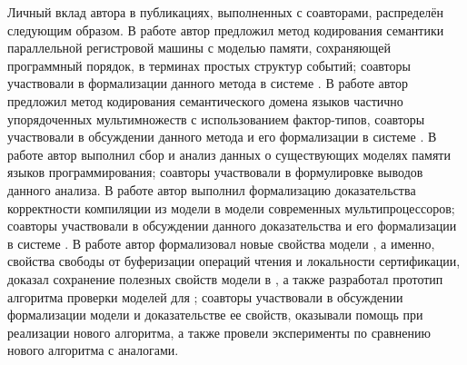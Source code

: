 
Личный вклад автора в публикациях, выполненных с соавторами, распределён следующим образом.
В работе \cite{Gladstein-al:ISPRAS21} автор предложил
метод кодирования семантики параллельной регистровой машины с
моделью памяти, сохраняющей программный порядок, в терминах простых структур событий;
соавторы участвовали в формализации данного метода в системе \coq.
В работе \cite{Moiseenko-al:STJITMO22} автор предложил
метод кодирования семантического домена языков частично упорядоченных мультимножеств
с использованием фактор-типов, 
соавторы участвовали в обсуждении данного метода и его формализации в системе \coq.
В работе \cite{Moiseenko-al:PCS21} автор выполнил сбор и анализ данных
о существующих моделях памяти языков программирования;
соавторы участвовали в формулировке выводов данного анализа.
В работе \cite{Moiseenko-al:ECOOP20} автор выполнил
формализацию доказательства корректности компиляции из
модели \Wkm в модели современных мультипроцессоров;
соавторы участвовали в обсуждении данного доказательства
и его формализации в системе \coq.
В работе \cite{Moiseenko-al:OOPSLA22} автор
формализовал новые свойства модели \WkmS,
а именно, свойства свободы от буферизации операций чтения и локальности сертификации,
доказал сохранение полезных свойств модели \Wkm в \WkmS,
а также разработал прототип алгоритма проверки моделей для \WkmS;
соавторы участвовали в обсуждении формализации модели \WkmS
и доказательстве ее свойств,
оказывали помощь при реализации нового алгоритма,
а также провели эксперименты по сравнению нового алгоритма с аналогами.
